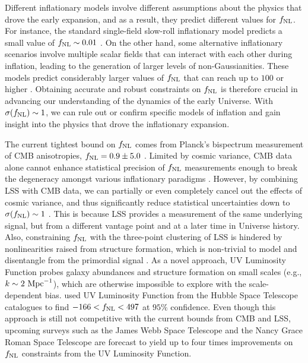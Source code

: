 Different inflationary models involve different assumptions about the physics that drove the early expansion, and as a result, they predict different values for $f_{\rm NL}$. For instance, the standard single-field slow-roll inflationary model predicts a small value of $f_{\rm NL} \sim 0.01$ \citep[see, also,][for a discussion]{2003JHEP...05..013M}. On the other hand, some alternative inflationary scenarios involve multiple scalar fields that can interact with each other during inflation, leading to the generation of larger levels of non-Gaussianities. These models predict considerably larger values of $f_{\rm NL}$ that can reach up to $100$ or higher \citep[see, e.g.,][]{alvarez2014arXiv1412.4671A, de2017next}. Obtaining accurate and robust constraints on $f_{\rm NL}$ is therefore crucial in advancing our understanding of the dynamics of the early Universe. With $\sigma (f_{\rm NL})\sim 1$, we can rule out or confirm specific models of inflation and gain insight into the physics that drove the inflationary expansion.

The current tightest bound on $f_{\rm NL}$ comes from Planck's bispectrum measurement of CMB anisotropies, $f_{\rm NL}=0.9\pm 5.0$ \citep{akrami2019planck}. Limited by cosmic variance, CMB data alone cannot enhance statistical precision of $f_{\rm NL}$ measurements enough to break the degeneracy amongst various inflationary paradigms \citep[see, e.g.,][]{ade2019simons}. However, by combining LSS with CMB data, we can partially or even completely cancel out the effects of cosmic variance, and thus significantly reduce statistical uncertainties down to $\sigma(f_{\rm NL})\sim 1$ \citep[see, e.g.,][]{schmittfull2018PhRvD}. This is because LSS provides a measurement of the same underlying signal, but from a different vantage point and at a later time in Universe history. Also, constraining $f_{\rm NL}$ with the three-point clustering of LSS is hindered by nonlinearities raised from structure formation, which is non-trivial to model and disentangle from the primordial signal \citep{baldauf2011galaxy, baldauf2011primordial}. As a novel approach, UV Luminosity Function probes galaxy abundances and structure formation on small scales (e.g., $k \sim 2~{\rm Mpc}^{-1}$), which are otherwise impossible to explore with the scale-dependent bias. \cite{sabti2021JCAP} used UV Luminosity Function from the Hubble Space Telescope catalogues \citep{bouwens2015ApJ} to find $-166<f_{\rm NL}<497$ at $95\%$ confidence. Even though this approach is still not competitive with the current bounds from CMB and LSS, upcoming surveys such as the James Webb Space Telescope and the Nancy Grace Roman Space Telescope are forecast to yield up to four times improvements on $
f_{\rm NL}$ constraints from the UV Luminosity Function. 


